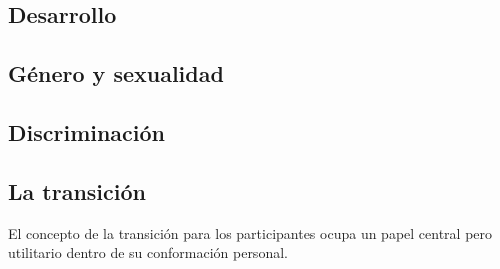 \subsection{Desarrollo}
%
%
%
\subsection{Género y sexualidad}
%
%
%
\subsection{Discriminación}
%
%
%
%
\subsection{La transición}

El concepto de la transición para los participantes ocupa un papel central pero utilitario dentro de su conformación personal.

%
%
%
